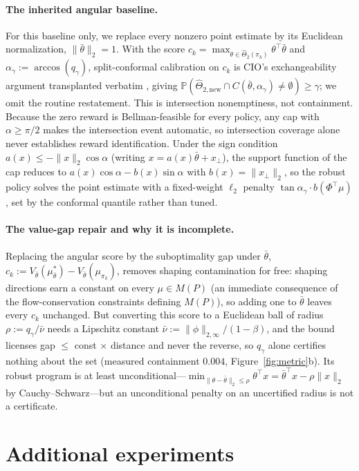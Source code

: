 \documentclass{article}
\begin{document}
\paragraph{The inherited angular baseline.} For this baseline only, we replace
every nonzero point estimate by its Euclidean normalization,
$\|\bar\theta\|_2=1$. With the score
$c_k=\max_{\theta\in\hat\Theta_2(\pi_k)}\theta^\top\bar\theta$ and
$\alpha_\gamma:=\arccos(q_\gamma)$, split-conformal calibration on $c_k$ is
CIO's exchangeability argument transplanted verbatim
\citep{vovk2005algorithmic}, giving
$\mathbb P(\hat\Theta_{2,\mathrm{new}}\cap
C(\bar\theta,\alpha_\gamma)\ne\emptyset)\ge\gamma$; we omit the routine
restatement. This is intersection nonemptiness, not containment. Because the
zero reward is Bellman-feasible for every policy, any cap with $\alpha\ge\pi/2$
makes the intersection event automatic, so intersection coverage alone never
establishes reward identification. Under the sign condition $a(x)\le-\|x\|_2\cos\alpha$
(writing $x=a(x)\bar\theta+x_\perp$), the support function of the cap reduces to
$a(x)\cos\alpha-b(x)\sin\alpha$ with $b(x)=\|x_\perp\|_2$, so the robust policy
solves the point estimate with a fixed-weight $\ell_2$ penalty
$\tan\alpha_\gamma\cdot b(\Phi^\top\mu)$, set by the conformal quantile rather
than tuned.

\paragraph{The value-gap repair and why it is incomplete.} Replacing the
angular score by the suboptimality gap under $\bar\theta$,
$c_k:=V_{\bar\theta}(\mu^*_{\bar\theta})-V_{\bar\theta}(\mu_{\pi_k})$, removes
shaping contamination for free: shaping directions earn a constant on every
$\mu\in M(P)$ (an immediate consequence of the flow-conservation constraints
defining $M(P)$), so adding one to $\bar\theta$ leaves every $c_k$ unchanged.
But converting this score to a Euclidean ball of radius
$\rho:=q_\gamma/\bar\nu$ needs a Lipschitz constant
$\bar\nu:=\|\phi\|_{2,\infty}/(1-\beta)$, and the bound licenses gap $\le$
const $\times$ distance and never the reverse, so $q_\gamma$ alone certifies
nothing about the set (measured containment $0.004$,
Figure~\ref{fig:metric}b). Its robust program is at least
unconditional---$\min_{\|\theta-\bar\theta\|_2\le\rho}\theta^\top
x=\bar\theta^\top x-\rho\|x\|_2$ by Cauchy--Schwarz---but an unconditional
penalty on an uncertified radius is not a certificate.

\section{Additional experiments}
\label{app:extra}
\end{document}
